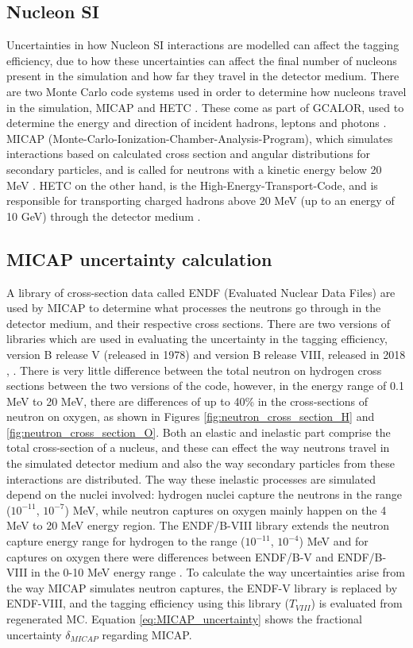 \subsection{Nucleon SI}
Uncertainties in how Nucleon SI interactions are modelled can affect the tagging efficiency, due to how these uncertainties can affect the final number of nucleons present in the simulation and how far they travel in the detector medium. There are two Monte Carlo code systems used in order to determine how nucleons travel in the simulation, MICAP and HETC \cite{micap_hetc}. These come as part of GCALOR, used to determine the energy and direction of incident hadrons, leptons and photons \cite{1998gcalor}. MICAP (Monte-Carlo-Ionization-Chamber-Analysis-Program), which simulates interactions based on calculated cross section and angular distributions for secondary particles, and is called for neutrons with a kinetic energy below 20 MeV \cite{Zeitnitz:1994bs}. HETC on the other hand, is the High-Energy-Transport-Code, and is responsible for transporting charged hadrons above 20 MeV (up to an energy of 10 GeV) through the detector medium \cite{gabrielhetc}. 

\subsection{MICAP uncertainty calculation}

A library of cross-section data called ENDF \cite{endf} (Evaluated Nuclear Data Files) are used by MICAP to determine what processes the neutrons go through in the detector medium, and their respective cross sections. There are two versions of libraries which are used in evaluating the uncertainty in the tagging efficiency, version B release V (released in 1978) and version B release VIII, released in 2018 \cite{endf8}, \cite{endf82}. There is very little difference between the total neutron on hydrogen cross sections between the two versions of the code, however, in the energy range of 0.1 MeV to 20 MeV, there are differences of up to 40\% in the cross-sections of neutron on oxygen, as shown in Figures \ref{fig:neutron_cross_section_H} and \ref{fig:neutron_cross_section_O}. Both an elastic and inelastic part comprise the total cross-section of a nucleus, and these can effect the way neutrons travel in the simulated detector medium and also the way secondary particles from these interactions are distributed. The way these inelastic processes are simulated depend on the nuclei involved: hydrogen nuclei capture the neutrons in the range ($10^{-11}$, $10^{-7}$) MeV, while neutron captures on oxygen mainly happen on the 4 MeV to 20 MeV energy region. The ENDF/B-VIII library extends the neutron capture energy range for hydrogen to the range ($10^{-11}$, $10^{-4}$) MeV and for captures on oxygen there were differences between ENDF/B-V and ENDF/B-VIII in the 0-10 MeV energy range \cite{akutsu_thesis}.  To calculate the way uncertainties arise from the way MICAP simulates neutron captures, the ENDF-V library is replaced by ENDF-VIII, and the tagging efficiency using this library ($T_{VIII}$) is evaluated from regenerated MC. Equation \ref{eq:MICAP_uncertainty} shows the fractional uncertainty $\delta_{MICAP}$ regarding MICAP.  

